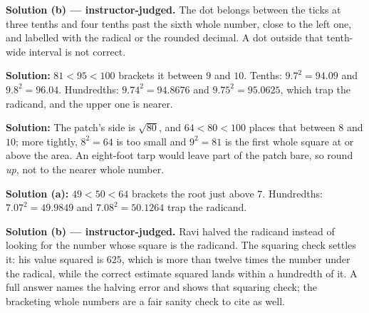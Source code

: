 \documentclass[12pt]{article}
\begin{document}
\textbf{Solution (b) --- instructor-judged.} \quad The dot belongs between the ticks at
three tenths and four tenths past the sixth whole number, close to the left one, and
labelled with the radical or the rounded decimal. A dot outside that tenth-wide interval is
not correct.


\textbf{Solution:} \quad $81 < 95 < 100$ brackets it between $9$ and $10$. Tenths:
$9.7^2 = 94.09$ and $9.8^2 = 96.04$. Hundredths: $9.74^2 = 94.8676$ and
$9.75^2 = 95.0625$, which trap the radicand, and the upper one is nearer. 


\textbf{Solution:} \quad The patch's side is $\sqrt{80}$, and $64 < 80 < 100$ places that
between $8$ and $10$; more tightly, $8^2 = 64$ is too small and $9^2 = 81$ is the first
whole square at or above the area. An eight-foot tarp would leave part of the patch bare,
so round \emph{up}, not to the nearer whole number. 


\textbf{Solution (a):} \quad $49 < 50 < 64$ brackets the root just above $7$. Hundredths:
$7.07^2 = 49.9849$ and $7.08^2 = 50.1264$ trap the radicand. 

\textbf{Solution (b) --- instructor-judged.} \quad Ravi halved the radicand instead of
looking for the number whose square is the radicand. The squaring check settles it: his
value squared is $625$, which is more than twelve times the number under the radical, while
the correct estimate squared lands within a hundredth of it. A full answer names the
halving error and shows that squaring check; the bracketing whole numbers are a fair
sanity check to cite as well.
\end{document}
